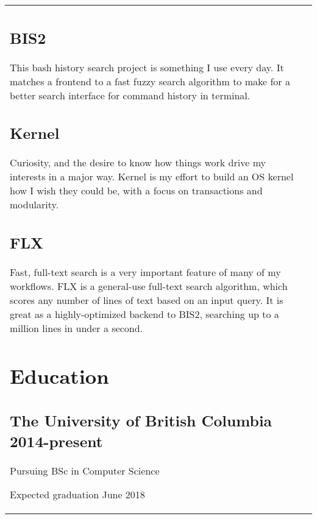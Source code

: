 \documentclass[letterpaper]{article}
\newlength{\leftcol}
\newlength{\rightcol}
\newcommand{\subtitle}{\normalfont\sffamily\color{black}\large}
\begin{document}
\begin{tabularx}{\textwidth}{@{}p{\leftcol} p{\rightcol}}
\subsection*{BIS2}

This bash history search project is something I use every day. It matches a
frontend to a fast fuzzy search algorithm to make for a better search interface
for command history in terminal.

\subsection*{Kernel}

Curiosity, and the desire to know how things work drive my interests in a major
way. Kernel is my effort to build an OS kernel how I wish they could be, with a
focus on transactions and modularity.

\subsection*{FLX}

Fast, full-text search is a very important feature of many of my workflows. FLX
is a general-use full-text search algorithm, which scores any number of lines of
text based on an input query. It is great as a highly-optimized backend to BIS2,
searching up to a million lines in under a second.

\section*{Education}

\subsection*{The University of British Columbia \subtitle 2014-present}

Pursuing BSc in Computer Science

Expected graduation June 2018
\end{tabularx}
\end{document}

